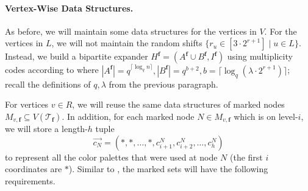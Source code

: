 \documentclass[11pt,a4paper]{article}
\newcommand{\ceil}[1]{\lceil #1 \rceil}
\newcommand{\tree}{\mathcal{T}}
\newcommand{\freq}{\mathbf{f}}
\begin{document}
\paragraph*{Vertex-Wise Data Structures.} As before, we will maintain some data structures for the vertices in $V$. For the vertices in $L$, we will not maintain the random shifts $\{r_u\in [3\cdot 2^{r+1}] \mid u\in L\}$. Instead, we build a bipartite expander $H^\freq = (A^\freq\cup B^\freq, I^\freq)$ using multiplicity codes according to  where $|A^\freq| = q^{\ceil{\log_q n}}, |B^\freq| = q^{b+2}, b = \ceil{\log_q(\lambda\cdot 2^{r+1})}$; recall the definitions of $q, \lambda$ from the previous paragraph.

For vertices $v\in R$, we will reuse the same data structures of marked nodes $M_{v, \freq}\subseteq V(\tree_\freq)$. In addition, for each marked node $N\in M_{v, \freq}$ which is on level-$i$, we will store a length-$h$ tuple $$\overrightarrow{c_N} = (*, *, \ldots, *, c^N_{i+1}, c^N_{i+2}, \ldots, c^N_h)$$ to represent all the color palettes that were used at node $N$ (the first $i$ coordinates are $*$). Similar to , the marked sets will have the following requirements.
\end{document}
